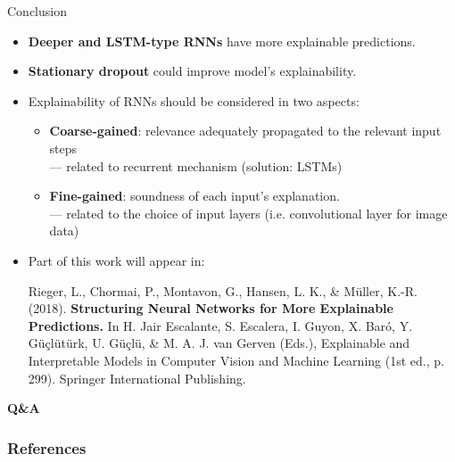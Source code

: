 \documentclass[Nike]{tuberlinbeamer}
\begin{document}
\begin{frame}{Conclusion}

\begin{itemize}
	\item \textbf{Deeper and LSTM-type RNNs} have more explainable predictions.
	\item \textbf{Stationary dropout} could improve model's explainability.
	\item Explainability of RNNs should be considered in two aspects:
		\begin{itemize}
			\item \textbf{Coarse-gained}: relevance adequately propagated to the relevant input steps \\
					--- related to recurrent mechanism (solution: LSTMs)
			\item \textbf{Fine-gained}: soundness of each input's explanation.\\
					--- related to the choice of input layers (i.e. convolutional layer for image data)
		\end{itemize}
	\item Part of this work will appear in: \\
{ \small \vspace{0.2cm}
Rieger, L., Chormai, P., Montavon, G., Hansen, L. K., \& Müller, K.-R. (2018). \textbf{Structuring Neural Networks for More Explainable Predictions.} In H. Jair Escalante, S. Escalera, I. Guyon, X. Baró, Y. Güçlütürk, U. Güçlü, \& M. A. J. van Gerven (Eds.), Explainable and Interpretable Models in Computer Vision and Machine Learning (1st ed., p. 299). Springer International Publishing.

}

\end{itemize}
\end{frame}


\begin{frame}{}
\vfill \centering
\LARGE \textbf{Q\&A}
\vfill
\end{frame}

\begin{frame}[allowframebreaks]
        \frametitle{References}
        
        
\end{frame}
\end{document}
